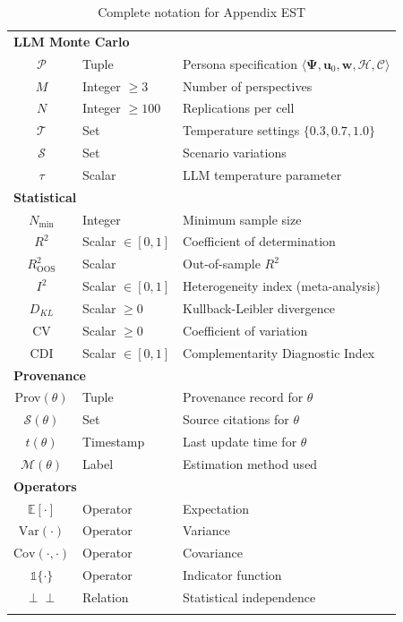 \documentclass[11pt,a4paper]{article}
\theoremstyle{definition}
\begin{document}
\begin{longtable}{clp{8cm}}
\multicolumn{3}{l}{\textbf{LLM Monte Carlo}} \\
$\mathcal{P}$ & Tuple & Persona specification $\langle \boldsymbol{\Psi}, \mathbf{u}_0, \mathbf{w}, \mathcal{H}, \mathcal{C} \rangle$ \\
$M$ & Integer $\geq 3$ & Number of perspectives \\
$N$ & Integer $\geq 100$ & Replications per cell \\
$\mathcal{T}$ & Set & Temperature settings $\{0.3, 0.7, 1.0\}$ \\
$\mathcal{S}$ & Set & Scenario variations \\
$\tau$ & Scalar & LLM temperature parameter \\
\midrule

\multicolumn{3}{l}{\textbf{Statistical}} \\
$N_{\min}$ & Integer & Minimum sample size \\
$R^2$ & Scalar $\in [0,1]$ & Coefficient of determination \\
$R^2_{\text{OOS}}$ & Scalar & Out-of-sample $R^2$ \\
$I^2$ & Scalar $\in [0,1]$ & Heterogeneity index (meta-analysis) \\
$D_{KL}$ & Scalar $\geq 0$ & Kullback-Leibler divergence \\
CV & Scalar $\geq 0$ & Coefficient of variation \\
CDI & Scalar $\in [0,1]$ & Complementarity Diagnostic Index \\
\midrule

\multicolumn{3}{l}{\textbf{Provenance}} \\
Prov$(\theta)$ & Tuple & Provenance record for $\theta$ \\
$\mathcal{S}(\theta)$ & Set & Source citations for $\theta$ \\
$t(\theta)$ & Timestamp & Last update time for $\theta$ \\
$\mathcal{M}(\theta)$ & Label & Estimation method used \\
\midrule

\multicolumn{3}{l}{\textbf{Operators}} \\
$\mathbb{E}[\cdot]$ & Operator & Expectation \\
$\text{Var}(\cdot)$ & Operator & Variance \\
$\text{Cov}(\cdot, \cdot)$ & Operator & Covariance \\
$\mathbb{1}\{\cdot\}$ & Operator & Indicator function \\
$\perp\!\!\!\perp$ & Relation & Statistical independence \\
\bottomrule
\caption{Complete notation for Appendix EST}
\label{tab:bbb-notation}
\end{longtable}
\end{document}
